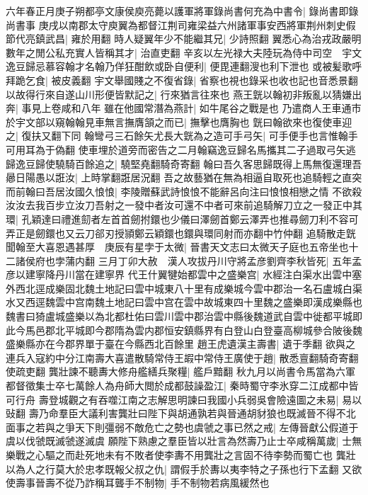 六年春正月庚子朔都亭文康侯庾亮薨以護軍將軍錄尚書何充為中書令|{
	錄尚書即錄尚書事}
庚戌以南郡太守庾翼為都督江荆司雍梁益六州諸軍事安西將軍荆州刺史假節代亮鎮武昌|{
	雍於用翻}
時人疑翼年少不能繼其兄|{
	少詩照翻}
翼悉心為治戎政嚴明數年之閒公私充實人皆稱其才|{
	治直吏翻}
辛亥以左光禄大夫陸玩為侍中司空　宇文逸豆歸忌慕容翰才名翰乃佯狂酣飲或卧自便利|{
	便毘連翻溲也利下泄也}
或被髪歌呼拜跪乞食|{
	被皮義翻}
宇文舉國賤之不復省錄|{
	省察也視也錄采也收也記也音悉景翻}
以故得行來自遂山川形便皆默記之|{
	行來猶言往來也}
燕王皝以翰初非叛亂以猜嫌出奔|{
	事見上卷咸和八年}
雖在他國常潛為燕計|{
	如牛尾谷之戰是也}
乃遣商人王車通市於宇文部以窺翰翰見車無言撫膺頷之而已|{
	撫擊也膺胸也}
皝曰翰欲來也復使車迎之|{
	復扶又翻下同}
翰彎弓三石餘矢尤長大皝為之造可手弓矢|{
	可手便手也言惟翰手可用耳為于偽翻}
使車埋於道旁而密告之二月翰竊逸豆歸名馬攜其二子過取弓矢逃歸逸豆歸使驍騎百餘追之|{
	驍堅堯翻騎奇寄翻}
翰曰吾久客思歸既得上馬無復還理吾曏日陽愚以誑汝|{
	上時掌翻誑居況翻}
吾之故藝猶在無為相逼自取死也追騎輕之直突而前翰曰吾居汝國久悢悢|{
	李陵贈蘇武詩悢悢不能辭呂向注曰悢悢相戀之情}
不欲殺汝汝去我百步立汝刀吾射之一發中者汝可還不中者可來前追騎解刀立之一發正中其環|{
	孔穎達曰禮進劎者左首首劒拊鐶也少儀曰澤劒首鄭云澤弄也推尋劒刀利不容可弄正是劒鐶也又云刀郤刃授頴鄭云穎鐶也鐶與環同射而亦翻中竹仲翻}
追騎散走皝聞翰至大喜恩遇甚厚　庚辰有星孛于太微|{
	晉書天文志曰太微天子庭也五帝坐也十二諸侯府也孛蒲内翻}
三月丁卯大赦　漢人攻拔丹川守將孟彦劉齊李秋皆死|{
	五年孟彦以建寧降丹川當在建寧界}
代王什翼犍始都雲中之盛樂宫|{
	水經注白渠水出雲中塞外西北逕成樂固北魏土地記曰雲中城東八十里有成樂城今雲中郡治一名石盧城白渠水又西逕魏雲中宫南魏土地記曰雲中宫在雲中故城東四十里魏之盛樂即漢成樂縣也魏書曰猗盧城盛樂以為北都杜佑曰雲川雲中郡治雲中縣後魏道武自雲中徙都平城即此今馬邑郡北平城即今郡隋為雲内郡恒安鎮縣界有白登山白登臺高柳城參合陂後魏盛樂縣亦在今郡界單于臺在今縣西北百餘里}
趙王虎遺漢主壽書|{
	遺于季翻}
欲與之連兵入寇約中分江南壽大喜遣散騎常侍王嘏中常侍王廣使于趙|{
	散悉亶翻騎奇寄翻使疏吏翻}
龔壯諫不聽夀大修舟艦繕兵聚糧|{
	艦戶黯翻}
秋九月以尚書令馬當為六軍都督徵集士卒七萬餘人為舟師大閲於成都鼓譟盈江|{
	秦時蜀守李氷穿二江成都中皆可行舟}
壽登城觀之有吞噬江南之志解思明諫曰我國小兵弱吳會險遠圖之未易|{
	易以䜴翻}
壽乃命羣臣大議利害龔壯曰陛下與胡通孰若與晉通胡豺狼也既滅晉不得不北面事之若與之爭天下則彊弱不敵危亡之勢也虞虢之事已然之戒|{
	左傳晉獻公假道于虞以伐虢既滅虢遂滅虞}
願陛下熟慮之羣臣皆以壯言為然壽乃止士卒咸稱萬歲|{
	士無樂戰之心驅之而赴死地未有不敗者使李夀不用龔壯之言固不待李勢而蜀亡也}
龔壯以為人之行莫大於忠孝既報父叔之仇|{
	謂假手於夀以夷李特之子孫也行下孟翻}
又欲使壽事晉壽不從乃詐稱耳聾手不制物|{
	手不制物若病風緩然也}
